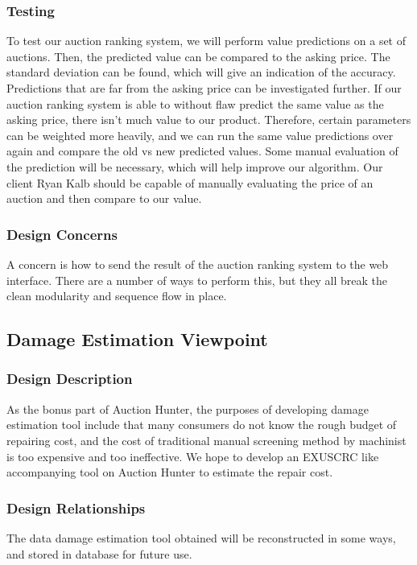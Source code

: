\documentclass[onecolumn, draftclsnofoot, 10pt, compsoc]{IEEEtran}
\begin{document}
\subsubsection{Testing}
To test our auction ranking system, we will perform value predictions on a set of auctions. Then, the predicted value can be compared to the asking price. The standard deviation can be found, which will give an indication of the accuracy. Predictions that are far from the asking price can be investigated further. If our auction ranking system is able to without flaw predict the same value as the asking price, there isn't much value to our product. Therefore, certain parameters can be weighted more heavily, and we can run the same value predictions over again and compare the old vs new predicted values. Some manual evaluation of the prediction will be necessary, which will help improve our algorithm. Our client Ryan Kalb should be capable of manually evaluating the price of an auction and then compare to our value.  

\subsubsection{Design Concerns}
A concern is how to send the result of the auction ranking system to the web interface. There are a number of ways to perform this, but they all break the clean modularity and sequence flow in place. 




\subsection{Damage Estimation Viewpoint}
\subsubsection{Design Description}
As the bonus part of Auction Hunter, the purposes of developing damage estimation tool include that many consumers do not know the rough budget of repairing cost, and the cost of traditional manual screening method by machinist is too expensive and too ineffective. We hope to develop an EXUSCRC like accompanying tool on Auction Hunter to estimate the repair cost.   
\subsubsection{Design Relationships}
The data damage estimation tool obtained will be reconstructed in some ways, and stored in database for future use.
\end{document}
